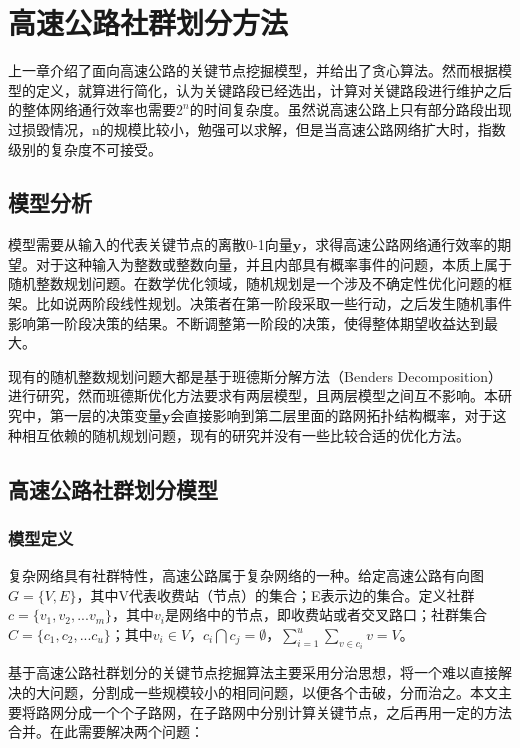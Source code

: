 
\chapter{高速公路社群划分方法}

	上一章介绍了面向高速公路的关键节点挖掘模型，并给出了贪心算法。然而根据模型的定义，就算进行简化，认为关键路段已经选出，计算对关键路段进行维护之后的整体网络通行效率也需要$2^n$的时间复杂度。虽然说高速公路上只有部分路段出现过损毁情况，n的规模比较小，勉强可以求解，但是当高速公路网络扩大时，指数级别的复杂度不可接受。

	\section{模型分析}
		模型需要从输入的代表关键节点的离散0-1向量$\bm{y}$，求得高速公路网络通行效率的期望。对于这种输入为整数或整数向量，并且内部具有概率事件的问题，本质上属于随机整数规划问题。在数学优化领域，随机规划是一个涉及不确定性优化问题的框架。比如说两阶段线性规划。决策者在第一阶段采取一些行动，之后发生随机事件影响第一阶段决策的结果。不断调整第一阶段的决策，使得整体期望收益达到最大。

		现有的随机整数规划问题大都是基于班德斯分解方法（Benders Decomposition）进行研究，然而班德斯优化方法要求有两层模型，且两层模型之间互不影响。本研究中，第一层的决策变量$\bm{y}$会直接影响到第二层里面的路网拓扑结构概率，对于这种相互依赖的随机规划问题，现有的研究并没有一些比较合适的优化方法。

	\section{高速公路社群划分模型}

		\subsection{模型定义}
			复杂网络具有社群特性，高速公路属于复杂网络的一种。给定高速公路有向图$G=\{V,E\}$，其中V代表收费站（节点）的集合；E表示边的集合。定义社群$c=\{v_1,v_2,...v_m\}$，其中$v_i$是网络中的节点，即收费站或者交叉路口；社群集合$C=\{c_1,c_2,...c_u\}$；其中$v_i \in V$，${c_i}\bigcap {{c_j}}  = \emptyset$，$\sum\limits_{i = 1}^u {\sum\limits_{v \in {c_i}} v  = V}$。

			基于高速公路社群划分的关键节点挖掘算法主要采用分治思想，将一个难以直接解决的大问题，分割成一些规模较小的相同问题，以便各个击破，分而治之。本文主要将路网分成一个个子路网，在子路网中分别计算关键节点，之后再用一定的方法合并。在此需要解决两个问题：

